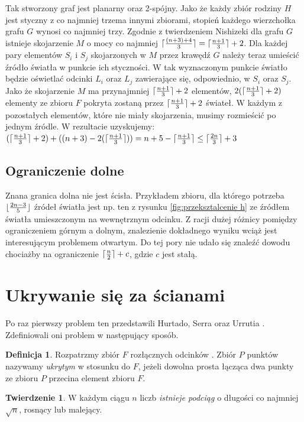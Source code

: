 \documentclass[brudnopis]{xmgr}
\DeclarePairedDelimiter\ceil{\lceil}{\rceil}
\DeclarePairedDelimiter\floor{\lfloor}{\rfloor}
\theoremstyle{definition}
\newtheorem{Twierdzenie}{Twierdzenie}
\newtheorem{Definicja}{Definicja}
\begin{document}
Tak stworzony graf jest planarny oraz 2-spójny. Jako że każdy zbiór rodziny $H$ jest styczny z co najmniej trzema innymi zbiorami, stopień każdego wierzchołka grafu $G$ wynosi co najmniej trzy. Zgodnie z twierdzeniem Nishizeki \cite{nishizeki} dla grafu $G$ istnieje skojarzenie $M$ o mocy co najmniej $\ceil{\frac{(n+3)+4}{3}} = \ceil{\frac{n+1}{3}}  + 2$. Dla każdej pary elementów $S_i$ i $S_j$ skojarzonych w $M$ przez krawędź $G$ należy teraz umieścić źródło światła w punkcie ich styczności. W tak wyznaczonym punkcie światło będzie oświetlać odcinki $L_i$ oraz $L_j$ zawierające się, odpowiednio, w $S_i$ oraz $S_j$. Jako że skojarzenie $M$ ma przynajmniej $\ceil{\frac{n+1}{3}} + 2$ elementów, $2(\ceil{\frac{n+1}{3}} + 2)$ elementy ze zbioru $F$ pokryta zostaną przez $\ceil{\frac{n+1}{3}} + 2$ świateł. W każdym z pozostałych elementów, które nie miały skojarzenia, musimy rozmieścić po jednym źródle. W rezultacie uzyskujemy:
$(\ceil{\frac{n+1}{3}} + 2) + ((n + 3) - 2(\ceil{\frac{n+1}{3}})) = n + 5 - \ceil{\frac{n+1}{3}} \le \ceil{\frac{2n}{3}} + 3$

\subsection{Ograniczenie dolne}
\indent Znana granica dolna nie jest ścisła. Przykładem zbioru, dla którego potrzeba $\floor{\frac{2n-3}{5}}$ źródeł światła jest np. ten z rysunku \ref{fig:przeksztalcenie h} ze źródłem światła umieszczonym na wewnętrznym odcinku. Z racji dużej różnicy pomiędzy ograniczeniem górnym a dolnym, znalezienie dokładnego wyniku wciąż jest interesującym problemem otwartym. Do tej pory nie udało się znaleźć dowodu chociażby na ograniczenie $\ceil{\frac{n}{2}} + c$, gdzie $c$ jest stałą.

\section{Ukrywanie się za ścianami}
Po raz pierwszy problem ten przedstawili Hurtado, Serra oraz Urrutia \cite{sciany}. Zdefiniowali oni problem w następujący sposób.

\begin{Definicja}\label{ukrywanie definicja}
 Rozpatrzmy zbiór $F$ rozłącznych odcinków . Zbiór $P$ punktów nazywamy \emph{ukrytym} w stosunku do $F$, jeżeli dowolna prosta łącząca dwa punkty ze zbioru $P$ przecina element zbioru $F$.
\end{Definicja}

\begin{Twierdzenie}\label{podciag rosnacy} \cite{illumination}
  W każdym ciągu $n$ liczb \emph{istnieje podciąg} o długości co najmniej $\sqrt{n}$, rosnący lub malejący.
\end{Twierdzenie}
\end{document}
